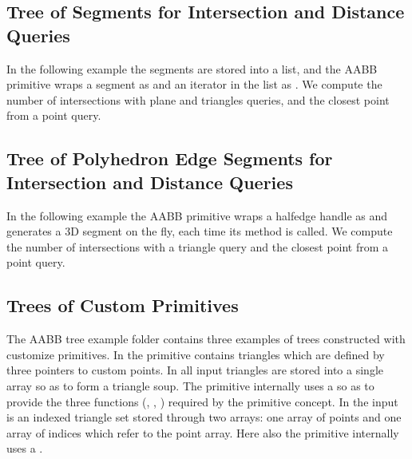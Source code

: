 \subsection{Tree of Segments for Intersection and Distance Queries}
In the following example the segments are stored into a list, and the AABB primitive wraps a segment as  and an iterator in the list as . We compute the number of intersections with plane and triangles queries, and the closest point from a point query. 

\subsection{Tree of Polyhedron Edge Segments for Intersection and Distance Queries}
In the following example the AABB primitive wraps a halfedge handle as  and generates a 3D segment on the fly, each time its method  is called. We compute the number of intersections with a triangle query and the closest point from a point query. 

\subsection{Trees of Custom Primitives}

The AABB tree example folder contains three examples of trees constructed with customize primitives. In  the primitive contains triangles which are defined by three pointers to custom points. In  all input triangles are stored into a single array so as to form a triangle soup. The primitive internally uses a  so as to provide the three functions (, , ) required by the primitive concept. In  the input is an indexed triangle set stored through two arrays: one array of points and one array of indices which refer to the point array. Here also the primitive internally uses a .

